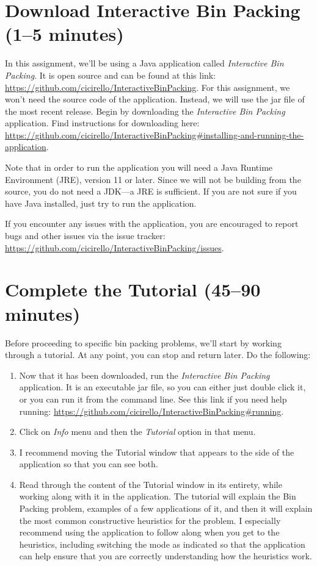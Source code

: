 \documentclass[11pt,letterpaper]{article}
\begin{document}
\section{Download Interactive Bin Packing (1--5 minutes)}\label{sec:download}
In this assignment, we'll be using a Java application 
called {\em Interactive Bin Packing}. It is open source and
can be found at this 
link: \url{https://github.com/cicirello/InteractiveBinPacking}.
For this assignment, we won't need the source code of the application.
Instead, we will use the jar file of the most recent release.
Begin by downloading the {\em Interactive Bin Packing}
application. Find instructions for downloading
here: \url{https://github.com/cicirello/InteractiveBinPacking#installing-and-running-the-application}. 

Note that in order to run the application you will need
a Java Runtime Environment (JRE), version 11 or later. Since we will
not be building from the source, you do not need a JDK---a JRE is sufficient.
If you are not sure if you have Java installed, just try to run the 
application. 

If you encounter any issues with the application, you are encouraged to
report bugs and other issues via the issue tracker: 
\url{https://github.com/cicirello/InteractiveBinPacking/issues}.


\section{Complete the Tutorial (45--90 minutes)}\label{sec:tutorial}
Before proceeding to specific bin packing problems, we'll start
by working through a tutorial. At any point, you can stop and return 
later. Do the following:
\begin{enumerate}[leftmargin=*, parsep=0pt, itemsep=2pt, topsep=2pt]
\item Now that it has been downloaded, run the {\em Interactive Bin Packing}
application. It is an executable jar file, so you can either just double click
it, or you can run it from the command line.  See this link if you need
help running: \url{https://github.com/cicirello/InteractiveBinPacking#running}.
\item Click on {\em Info} menu and then the {\em Tutorial} option in that menu.
\item I recommend moving the Tutorial window that appears to the 
side of the application so that you can see both.
\item Read through the content of the Tutorial window in its 
entirety, while working along with it in the application. The tutorial 
will explain the Bin Packing problem, examples of a few applications 
of it, and then it will explain the most common constructive heuristics 
for the problem. I especially recommend using the application to 
follow along when you get to the heuristics, including switching the mode
as indicated so that the application can help ensure that you are 
correctly understanding how the heuristics work.
\end{enumerate}
\end{document}
